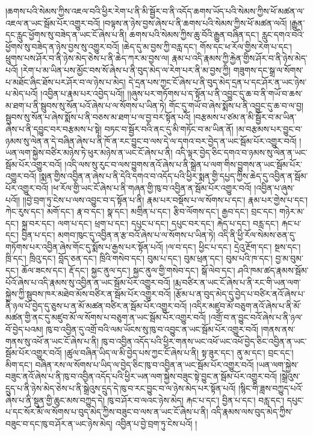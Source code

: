 །ཆགས་པའི་སེམས་ཀྱིས་འཇལ་བའི་ཕྱིར་རེག་པ་ནི་མི་སྦྱོར་བ་ནི་འདོད་ཆགས་ཡོད་པའི་སེམས་ཀྱིས་ཕོ་མཚན་ལ་འཇལ་ན་ཡང་སྦོམ་པོར་འགྱུར་བའོ། །བལྟས་ན་ཉེས་བྱས་ཞེས་པ་ནི་ཆགས་པའི་སེམས་ཀྱིས་ཕོ་མཚན་ལའོ། །རྒྱུན་དང་རླུང་ཕྱོགས་སུ་བཟེད་ན་ཡང་ངོ་ཞེས་པ་ནི། ཆགས་པའི་སེམས་ཀྱིས་ཆུ་བོའི་རྒྱུན་བཞིན་དང་། རླུང་དགའ་བའི་ཕྱོགས་སུ་བཟེད་ན་ཉེས་བྱས་སུ་འགྱུར་བའོ། །ཆེད་དུ་མ་བྱས་ཀྱི་བརླ་དང་།  གོས་དང་ཕ་རོལ་གྱིས་རེག་པ་དང་། ཕྲུགས་པས་ཤོར་བ་ནི་ཉེས་མེད་ཅེས་པ་ནི་ཆེད་ཀར་མ་བྱས་ལ། རྣམ་པ་འདི་རྣམས་ཀྱི་རྐྱེན་གྱིས་ཤོར་བ་ནི་ཉེས་མེད་པའོ། །རེག་པ་མ་ཡིན་པས་མྱོང་བས་སོ་ཞེས་པ་ནི་བུད་མེད་ལ་རེག་པར་ནི་མ་བྱས་ཀྱི། གཟུགས་དང་སྒྲ་ལ་སོགས་པ་མཐོང་ཞིང་ཐོས་པར་ཤོར་བ་ལ་ཉེས་པ་མེད། དེ་དྲན་པས་ཀྱང་ངོ་ཞེས་པ་ནི་བུད་མེད་དྲན་པ་དང་ཤོར་ན་ཡང་ཉེས་པ་མེད་པའོ། །འབྱིན་པ་རྣམ་པར་འབྱེད་པའོ།། །།ཞུས་པར་གཏོགས་པ་ད་སྟོན་པ་ནི་འབྱུང་དུ་ཆ་བ་ནི་གཡོ་བ་ཆས་མ་ཐག་པ་ནི་སྦུབས་སུ་སོན་པའོ་ཞེས་པ་ལ་སོགས་པ་ཡིན་ཏེ། གོང་དུ་གཡོ་བ་ཞེས་སྨོས་པ་ནི་འབྱུང་དུ་ཆ་བ་ལ་བྱ། སྦུབས་སུ་སོན་པ་ཞེས་སྨོས་པ་ནི་བཅས་མ་ཐག་པ་ལ་བྱ་བར་སྟོན་པའོ། །བརྩམས་པ་ཙམ་ན་མི་སྦྱོར་བ་མ་ཡིན་ཞེས་པ་ནི་དབྱུང་བར་བརྩམས་པ་སྟེ། བཏང་བ་སྦྱོར་བའི་ནང་དུ་མི་གཏོང་བ་མ་ཡིན་ནོ། །མ་བརྩམས་པར་བྱུང་བ་ཉམས་སུ་ལེན་ན་དེ་བཞིན་ཞེས་པ་ནི་ཁོ་ན་རང་བྱུང་བ་ལས་དེ་ལ་དགའ་བར་བྱེད་ན་ཡང་སྦོམ་པོར་འགྱུར་བའོ། །ཡན་ལག་སྐྱེས་བཙིར་མཉེས་ཏེ་ཕུར་མཉེས་ན་ཡང་ངོ་ཞེས་པ་ནི། འདི་ལྟར་བྱེད་ཅིང་དགའ་བ་ཉམས་སུ་ལེན་ན་ཡང་སྦོམ་པོར་འགྱུར་བའོ། །འདི་ལས་སུ་རུང་བ་ལས་བྱུགས་ནའོ་ཞེས་པ་ནི་སྒྲེན་པ་ལག་གིས་བྱུགས་ན་ཡང་སྦོམ་པོར་འགྱུར་བའོ། །སྨན་གྱིས་འབྱིན་ན་ཞེས་པ་ནི་དེའི་དགའ་བ་འདོད་པའི་ཕྱིར་སྨན་གྱི་དཔྱད་ཀྱིས་ཆེད་དུ་འབྱིན་ན་སྦོམ་པོར་འགྱུར་བའོ། །ཕ་རོལ་གྱི་ཡང་ངོ་ཞེས་པ་ནི་གཞན་གྱི་ཁུ་བ་འབྱིན་ན་སྦོམ་པོར་འགྱུར་བའོ། །འབྱིན་པ་ཞུས་པའོ།། །།བྱེ་བྲག་ཏུ་ངེས་པ་ལས་འབྱུང་བ་ད་སྟོན་པ་ནི། རྣམ་པར་བསྡོས་པ་ལ་སོགས་པ་དང་། རྣམ་པར་གྱེས་པ་དང་། ཀེང་རུས་དང་། མགོ་དང་། རྣ་བ་དང་། སྣ་དང་། མགྲིན་པ་དང་། རྩིབ་ལོགས་དང་། རྒྱབ་དང་། བྲང་དང་། གཉེར་མ་དང་། སྐྲ་བར་དང་། ལག་པ་དང་། ཕྲག་པ་དང་། དཔུང་པ་དང་། དཔུང་བར་དང་། རྐེད་པ་དང་། བརླ་དང་། རྐང་པ་དང་། བྱིན་པ་དང་། མགབ་ཁུང་དུ་འབྱིན་ན་རྩ་བའོ་ཞེས་པ་ལ་སོགས་པ་ཡིན་ཏེ། འདི་ནི་ཕྱི་རོལ་སེམས་ཅན་དུ་གཏོགས་པར་འབྱིན་ཞེས་གོང་དུ་སྨོས་པ་རྒྱས་པར་སྟོན་པའོ། །ལ་བ་དང་། ཕྱིང་པ་དང་། དྲེའུ་རྔོག་དང་། སྔས་དང་། ཁྲི་དང་། ཁྲིའུ་དང་། བློད་ཅན་དང་། ཁྲིའི་གསེབ་དང་། བུམ་པ་དང་། བུམ་ཕྲན་དང་། བུམ་པའི་ཁ་དང་། བྱ་མ་བུམ་དང་། ཆོལ་ཟངས་དང་། རྡོ་དང་། སྐྱང་ནུལ་དང་། སྐྱང་ནུལ་གྱི་གསེབ་དང་། སྒོ་ལེབ་དང་། ཤའི་ཁམ་ཚད་རྣམས་སྦོམ་པོའོ་ཞེས་པ་འདི་རྣམས་སུ་འབྱིན་ན་ཡང་སྦོམ་པོར་འགྱུར་བའོ། །རྨ་བཙིར་ན་ཡང་ངོ་ཞེས་པ་ནི་རང་གི་ཡན་ལག་སྐྱེས་ཀྱི་སྦུབས་ཁར་མཐེབ་མོས་བཙིར་ན་སྦོམ་པོར་འགྱུར་བའོ། །རྩོམ་པ་ན་བུད་མེད་དུ་བྱེད་པ་བཙིར་ནའོ་ཞེས་པ་ནི་ཉལ་པོ་བྱེད་དུ་ཅུས་པ་ན་མོ་མཚན་བཙིར་ན་སྦོམ་པོར་འགྱུར་བའོ། །འདིར་མཛུབ་མོ་བཅུག་ནའོ་ཞེས་པ་ནི་མོ་མཚན་གྱི་ནང་དུ་མཛུབ་མོ་ལ་སོགས་པ་བཅུག་ན་ཡང་སྦོམ་པོར་འགྱུར་བའོ། །འགྲོ་བ་ན་བྱུང་བའོ་ཞེས་པ་ནི་ཉལ་བོ་བྱེད་པའམ། ཁུ་བ་འབྱིན་དུ་འགྲོ་བའི་ལམ་ཡོངས་སུ་ཁུ་བ་འབྱུང་ན་ཡང་སྦོམ་པོར་འགྱུར་བའོ། །གནས་ནས་གནས་སུ་འཕོ་ན་ཡང་ངོ་ཞེས་པ་ནི། ཁུ་བ་འབྱིན་འདོད་པའི་ཕྱིར་གནས་ཡང་འཕོ་ཡང་འཕོ་བྱེད་ཅིང་འབྱིན་ན་ཡང་སྦོམ་པོར་འགྱུར་བའོ། །ཚུལ་བཞིན་ཡིད་ལ་མི་བྱེད་པས་ཀྱང་ངོ་ཞེས་པ་ནི། སྟ་ཟུར་དང་། ནུ་མ་དང་། བྲང་དང་། མིག་དང་། བཞིན་རས་ལ་སོགས་པ་ཡིད་ལ་བྱེད་ཅིང་ཁུ་བ་འབྱིན་ན་ཡང་སྦོམ་པོར་འགྱུར་བའོ། །ཡན་ལག་སྐྱེས་བཟུང་ནའོ་ཞེས་པ་ནི་ཁུ་བ་འབྱིན་འདོད་པའི་ཕྱིར་ཡན་ལག་སྐྱེས་བཟུང་སྟེ་བྱུང་ན་སྦོམ་པོར་འགྱུར་བའོ། །སྒྲེའུས་དྲུད་པ་ནི་ཉེས་མེད་ཅེས་པ་ནི་སྒྲེའུས་དྲུད་དེ་ཁུ་བ་རང་བྱུང་བ་ལ་ཉེས་མེད་པར་སྟོན་པའོ། །སྙིང་གི་ཟླས་བཀྱུད་པའོ་ཞེས་པ་ནི་སྡུན་གྱི་ཆུང་མས་བཀྱུད་དེ། ཁུ་བ་ཤོར་བ་ལའང་ཉེས་མེད། རྐང་པ་དང་། བྱིན་པ་དང་། བརླ་དང་། དཔུང་པ་དང་སོར་མོ་ལ་སོགས་པ་བུད་མེད་ཀྱིས་བཟུང་བ་ལས་ན་ཡང་ངོ་ཞེས་པ་ནི། འདི་རྣམས་ལས་བུད་མེད་ཀྱིས་བཟུང་བ་དང་ཁུ་བ་ཤོར་ན་ཡང་ཉེས་མེད། འབྱིན་པ་བྱེ་བྲག་ཏུ་ངེས་པའོ། །
